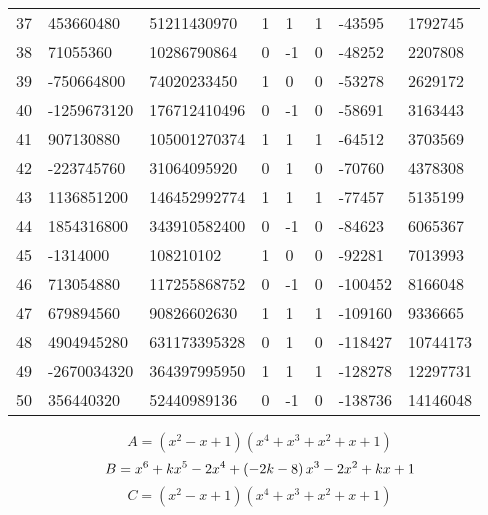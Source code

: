 \documentclass{amsart}
\begin{document}
\begin{longtable}{|l|l|l|lllll|}
37&453660480&51211430970&1&1&1&-43595&1792745\\
38&71055360&10286790864&0&-1&0&-48252&2207808\\
39&-750664800&74020233450&1&0&0&-53278&2629172\\
40&-1259673120&176712410496&0&-1&0&-58691&3163443\\
41&907130880&105001270374&1&1&1&-64512&3703569\\
42&-223745760&31064095920&0&1&0&-70760&4378308\\
43&1136851200&146452992774&1&1&1&-77457&5135199\\
44&1854316800&343910582400&0&-1&0&-84623&6065367\\
45&-1314000&108210102&1&0&0&-92281&7013993\\
46&713054880&117255868752&0&-1&0&-100452&8166048\\
47&679894560&90826602630&1&1&1&-109160&9336665\\
48&4904945280&631173395328&0&1&0&-118427&10744173\\
49&-2670034320&364397995950&1&1&1&-128278&12297731\\
50&356440320&52440989136&0&-1&0&-138736&14146048\\
\hline
\end{longtable}
$$A=(x^2
 - x
 + 1)(x^4
 + x^3
 + x^2
 + x
 + 1)$$
$$B=x^6
 + k\*x^5
 - 2\*x^4
 + \left(-2\*k
 - 8\right) \*x^3
 - 2\*x^2
 + k\*x
 + 1$$
$$C=(x^2
 - x
 + 1)(x^4
 + x^3
 + x^2
 + x
 + 1)$$
\end{document}
